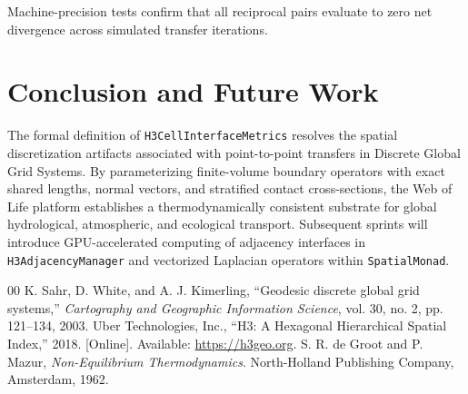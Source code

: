 \documentclass[10pt,journal,compsoc]{IEEEtran}
\begin{document}
Machine-precision tests confirm that all reciprocal pairs evaluate to zero net divergence across simulated transfer iterations.

\section{Conclusion and Future Work}
The formal definition of \texttt{H3CellInterfaceMetrics} resolves the spatial discretization artifacts associated with point-to-point transfers in Discrete Global Grid Systems. By parameterizing finite-volume boundary operators with exact shared lengths, normal vectors, and stratified contact cross-sections, the Web of Life platform establishes a thermodynamically consistent substrate for global hydrological, atmospheric, and ecological transport. Subsequent sprints will introduce GPU-accelerated computing of adjacency interfaces in \texttt{H3AdjacencyManager} and vectorized Laplacian operators within \texttt{SpatialMonad}.

\begin{thebibliography}{00}
 K. Sahr, D. White, and A. J. Kimerling, ``Geodesic discrete global grid systems,'' \textit{Cartography and Geographic Information Science}, vol. 30, no. 2, pp. 121--134, 2003.
 Uber Technologies, Inc., ``H3: A Hexagonal Hierarchical Spatial Index,'' 2018. [Online]. Available: \url{https://h3geo.org}.
 S. R. de Groot and P. Mazur, \textit{Non-Equilibrium Thermodynamics}. North-Holland Publishing Company, Amsterdam, 1962.
\end{thebibliography}
\end{document}
